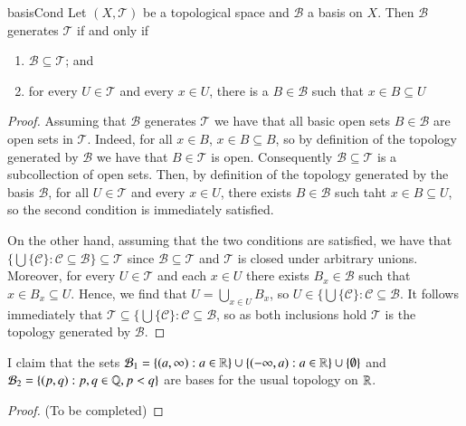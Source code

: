 \documentclass[12pt, a4paper, oneside, openright, titlepage]{book}
\begin{document}
\begin{corollary}{}{basisCond}
    Let $(X,\mathcal{T})$ be a topological space and $\mathcal{B}$ a basis on $X$. Then $\mathcal{B}$ generates $\mathcal{T}$ if and only if \begin{enumerate}
        \item $\mathcal{B}\subseteq \mathcal{T}$; and 
        \item for every $U \in \mathcal{T}$ and every $x \in U$, there is a $B \in \mathcal{B}$ such that $x \in B\subseteq U$
    \end{enumerate}
\end{corollary}
\begin{proof}

    Assuming that $\mathcal{B}$ generates $\mathcal{T}$ we have that all basic open sets $B \in \mathcal{B}$ are open sets in $\mathcal{T}$. Indeed, for all $x \in B$, $x \in B \subseteq B$, so by definition of the topology generated by $\mathcal{B}$ we have that $B \in \mathcal{T}$ is open. Consequently $\mathcal{B} \subseteq \mathcal{T}$ is a subcollection of open sets. Then, by definition of the topology generated by the basis $\mathcal{B}$, for all $U \in \mathcal{T}$ and every $x \in U$, there exists $B \in \mathcal{B}$ such taht $x \in B\subseteq U$, so the second condition is immediately satisfied.


    On the other hand, assuming that the two conditions are satisfied, we have that $\{\bigcup\{\mathcal{C}\}:\mathcal{C}\subseteq \mathcal{B}\} \subseteq \mathcal{T}$ since $\mathcal{B}\subseteq \mathcal{T}$ and $\mathcal{T}$ is closed under arbitrary unions. Moreover, for every $U \in \mathcal{T}$ and each $x \in U$ there exists $B_x \in \mathcal{B}$ such that $x \in B_x \subseteq U$. Hence, we find that $U = \bigcup_{x \in U}B_x$, so $U \in \{\bigcup\{\mathcal{C}\}:\mathcal{C}\subseteq\mathcal{B}$. It follows immediately that $\mathcal{T} \subseteq \{\bigcup\{\mathcal{C}\}:\mathcal{C}\subseteq\mathcal{B}$, so as both inclusions hold $\mathcal{T}$ is the topology generated by $\mathcal{B}$.
\end{proof}

\begin{exercise}
    I claim that the sets $\mathcal{B}_1 = \{(a,\infty): a\in \mathbb R\}\cup\{(-\infty,a):a\in\mathbb R\}\cup\{\emptyset\}$ and $\mathcal{B}_2 = \{(p,q):p,q\in\mathbb Q, p < q\}$ are bases for the usual topology on $\mathbb R$.
\end{exercise}
\begin{proof}
    (To be completed)
\end{proof}
\end{document}
